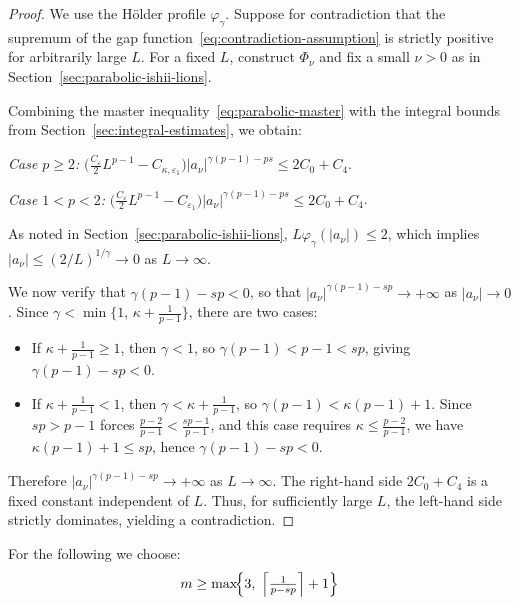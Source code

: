 \documentclass[11pt, a4paper, twoside]{article}
\theoremstyle{definition}
\theoremstyle{remark}
\begin{document}
\begin{proof}
We use the H\"{o}lder profile $\varphi_\gamma$. Suppose for contradiction that the supremum of the
gap function~\eqref{eq:contradiction-assumption} is strictly positive for arbitrarily large $L$.
For a fixed $L$, construct $\Phi_\nu$ and fix a small $\nu > 0$ as in
Section~\ref{sec:parabolic-ishii-lions}.

Combining the master inequality~\eqref{eq:parabolic-master} with the integral bounds from
Section~\ref{sec:integral-estimates}, we obtain:

\smallskip
\noindent\textit{Case $p \ge 2$:}
$\bigl(\tfrac{C_\varepsilon}{2}L^{p-1} - C_{\kappa,\varepsilon_1}\bigr)
|a_\nu|^{\gamma(p-1)-ps} \le 2C_0 + C_4$.

\smallskip
\noindent\textit{Case $1 < p < 2$:}
$\bigl(\tfrac{C_\varepsilon}{2}L^{p-1} - C_{\varepsilon_1}\bigr)
|a_\nu|^{\gamma(p-1)-ps} \le 2C_0 + C_4$.

\smallskip
As noted in Section~\ref{sec:parabolic-ishii-lions}, $L\varphi_\gamma(|a_\nu|) \le 2$, which
implies $|a_\nu| \le (2/L)^{1/\gamma} \to 0$ as $L \to \infty$.

We now verify that $\gamma(p-1) - sp < 0$, so that $|a_\nu|^{\gamma(p-1)-sp} \to +\infty$
as $|a_\nu| \to 0$. Since $\gamma < \min\!\bigl\{1,\,\kappa+\tfrac{1}{p-1}\bigr\}$, there are
two cases:
\begin{itemize}
  \item If $\kappa + \tfrac{1}{p-1} \ge 1$, then $\gamma < 1$, so
    $\gamma(p-1) < p-1 < sp$, giving $\gamma(p-1) - sp < 0$.
  \item If $\kappa + \tfrac{1}{p-1} < 1$, then $\gamma < \kappa + \tfrac{1}{p-1}$,
    so $\gamma(p-1) < \kappa(p-1) + 1$. Since $sp > p-1$ forces
    $\tfrac{p-2}{p-1} < \tfrac{sp-1}{p-1}$, and this case requires
    $\kappa \le \tfrac{p-2}{p-1}$, we have $\kappa(p-1)+1 \le sp$, hence
    $\gamma(p-1) - sp < 0$.
\end{itemize}
Therefore $|a_\nu|^{\gamma(p-1)-sp} \to +\infty$ as $L \to \infty$. The right-hand side
$2C_0 + C_4$ is a fixed constant independent of $L$. Thus, for sufficiently large $L$, the
left-hand side strictly dominates, yielding a contradiction.
\end{proof}

For the following we choose:
\[
  m \ge \max\!\Bigl\{3,\; \Bigl\lceil \tfrac{1}{p - sp} \Bigr\rceil + 1\Bigr\}
\]
\end{document}

